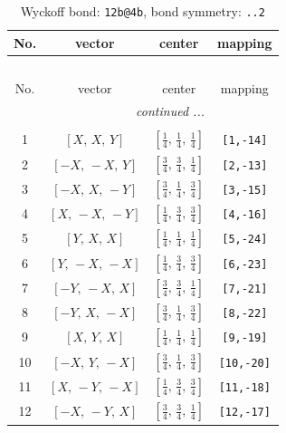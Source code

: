 \documentclass[fleqn,8pt]{jsarticle}
\begin{document}
\begin{longtable}{cccc}
\caption{Wyckoff bond: {\tt 12b@4b}, bond symmetry: {\tt ..2}}
 \\
 \hline \hline
No. & vector & center & mapping \\ \hline \endfirsthead

\multicolumn{3}{l}{\tablename\ \thetable{}} \\
 \hline \hline
No. & vector & center & mapping \\ \hline \endhead

 \hline \hline
\multicolumn{3}{r}{\footnotesize\it continued ...} \\ \endfoot

 \hline \hline
\multicolumn{3}{r}{} \\ \endlastfoot

1 & $\left[ X,\, X,\, Y \right]$ & $\left[ \frac{1}{4},\, \frac{1}{4},\, \frac{1}{4} \right]$ & {\tt [1,-14]} \\ \hline
2 & $\left[ - X,\, - X,\, Y \right]$ & $\left[ \frac{3}{4},\, \frac{3}{4},\, \frac{1}{4} \right]$ & {\tt [2,-13]} \\ \hline
3 & $\left[ - X,\, X,\, - Y \right]$ & $\left[ \frac{3}{4},\, \frac{1}{4},\, \frac{3}{4} \right]$ & {\tt [3,-15]} \\ \hline
4 & $\left[ X,\, - X,\, - Y \right]$ & $\left[ \frac{1}{4},\, \frac{3}{4},\, \frac{3}{4} \right]$ & {\tt [4,-16]} \\ \hline
5 & $\left[ Y,\, X,\, X \right]$ & $\left[ \frac{1}{4},\, \frac{1}{4},\, \frac{1}{4} \right]$ & {\tt [5,-24]} \\ \hline
6 & $\left[ Y,\, - X,\, - X \right]$ & $\left[ \frac{1}{4},\, \frac{3}{4},\, \frac{3}{4} \right]$ & {\tt [6,-23]} \\ \hline
7 & $\left[ - Y,\, - X,\, X \right]$ & $\left[ \frac{3}{4},\, \frac{3}{4},\, \frac{1}{4} \right]$ & {\tt [7,-21]} \\ \hline
8 & $\left[ - Y,\, X,\, - X \right]$ & $\left[ \frac{3}{4},\, \frac{1}{4},\, \frac{3}{4} \right]$ & {\tt [8,-22]} \\ \hline
9 & $\left[ X,\, Y,\, X \right]$ & $\left[ \frac{1}{4},\, \frac{1}{4},\, \frac{1}{4} \right]$ & {\tt [9,-19]} \\ \hline
10 & $\left[ - X,\, Y,\, - X \right]$ & $\left[ \frac{3}{4},\, \frac{1}{4},\, \frac{3}{4} \right]$ & {\tt [10,-20]} \\ \hline
11 & $\left[ X,\, - Y,\, - X \right]$ & $\left[ \frac{1}{4},\, \frac{3}{4},\, \frac{3}{4} \right]$ & {\tt [11,-18]} \\ \hline
12 & $\left[ - X,\, - Y,\, X \right]$ & $\left[ \frac{3}{4},\, \frac{3}{4},\, \frac{1}{4} \right]$ & {\tt [12,-17]} \\
\end{longtable}
\end{document}
